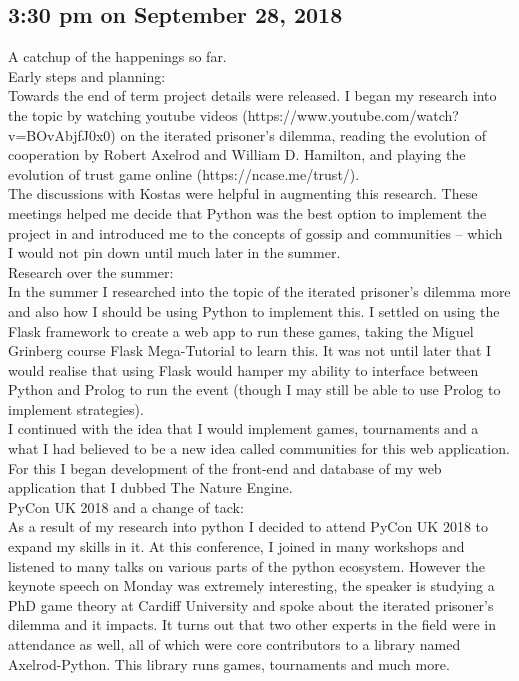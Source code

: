 \documentclass[]{final_report}
\begin{document}
\subsection*{3:30 pm on September 28, 2018}
A catchup of the happenings so far.\\
Early steps and planning:\\
Towards the end of term project details were released. I began my research into the topic by watching youtube videos (https://www.youtube.com/watch?v=BOvAbjfJ0x0) on the iterated prisoner’s dilemma, reading the evolution of cooperation by Robert Axelrod and William D. Hamilton, and playing the evolution of trust game online (https://ncase.me/trust/).\\
The discussions with Kostas were helpful in augmenting this research. These meetings helped me decide that Python was the best option to implement the project in and introduced me to the concepts of gossip and communities – which I would not pin down until much later in the summer.\\
Research over the summer:\\
In the summer I researched into the topic of the iterated prisoner’s dilemma more and also how I should be using Python to implement this. I settled on using the Flask framework to create a web app to run these games, taking the Miguel Grinberg course Flask Mega-Tutorial to learn this. It was not until later that I would realise that using Flask would hamper my ability to interface between Python and Prolog to run the event (though I may still be able to use Prolog to implement strategies).\\ 
I continued with the idea that I would implement games, tournaments and a what I had believed to be a new idea called communities for this web application. For this I began development of the front-end and database of my web application that I dubbed The Nature Engine.\\
PyCon UK 2018 and a change of tack:\\
As a result of my research into python I decided to attend PyCon UK 2018 to expand my skills in it. At this conference, I joined in many workshops and listened to many talks on various parts of the python ecosystem. However the keynote speech on Monday was extremely interesting, the speaker is studying a PhD game theory at Cardiff University and spoke about the iterated prisoner’s dilemma and it impacts. It turns out that two other experts in the field were in attendance as well, all of which were core contributors to a library named Axelrod-Python. This library runs games, tournaments and much more.\\
\end{document}
